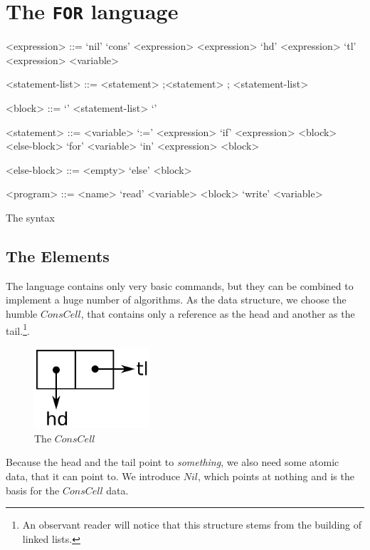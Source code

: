 \section{The {\tt FOR} language}
\label{sec:FOR}
\begin{table}[htb]
	\begin{grammar}
		<expression> ::= 
							`nil' 
				\alt 	`cons' <expression> <expression>
				\alt 	`hd' <expression>
				\alt 	`tl' <expression>
				\alt 	<variable>

		<statement-list> ::= <statement> ;\alt <statement> ; <statement-list>

		<block> ::= `{' <statement-list> `}'

		<statement> ::=
							<variable> `:=' <expression>
				\alt	`if' <expression> <block> <else-block>
				\alt	`for' <variable> `in' <expression> <block>
			
				<else-block> ::= <empty> \alt `else' <block>
				
				<program> ::= <name> `read' <variable> <block> `write' <variable>
	\end{grammar}
	\caption{The \FOR syntax \label{tab:FOR-syntax}}
\end{table}

\subsection{The Elements} %
\label{sub:TheElements}
The \FOR language contains only very basic commands, but they can be combined
to implement a huge number of algorithms. As the data structure, we choose 
the humble $ConsCell$, that contains only a reference as the head and 
another as the tail.\footnote{An observant reader will notice that this
structure stems from the building of linked lists.}.
\begin{figure}[htb]
	\begin{center}
		\includegraphics[height=3cm]{introduction/for/images/conscell}
	\end{center}
	\caption{The $ConsCell$}
\end{figure}

Because the head and the tail point to \emph{something}, we also need some 
atomic data, that it can point to. We introduce $Nil$, which points at 
nothing and is the basis for the $ConsCell$ data.

